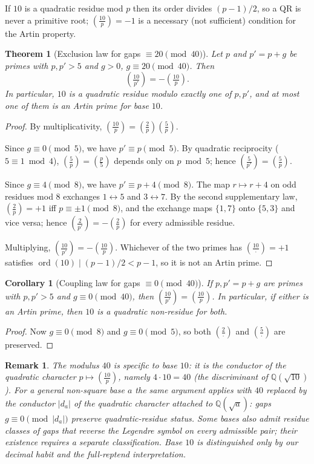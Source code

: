 \documentclass[11pt]{amsart}
\newtheorem{theorem}{Theorem}
\newtheorem{corollary}{Corollary}
\newtheorem{remark}{Remark}
\theoremstyle{definition}
\newcommand{\Lsym}[2]{\left(\tfrac{#1}{#2}\right)}
\begin{document}
If $10$ is a quadratic residue mod $p$ then its order divides $(p-1)/2$, so a
QR is never a primitive root; $\Lsym{10}{p} = -1$ is a necessary (not
sufficient) condition for the Artin property.

\begin{theorem}[Exclusion law for gaps $\equiv 20 \pmod{40}$]
	\label{thm:exclusion}
	Let $p$ and $p' = p + g$ be primes with $p, p' > 5$ and $g > 0$,
	$g \equiv 20 \pmod{40}$.
	Then
	\[
		\Lsym{10}{p'} = -\Lsym{10}{p}.
	\]
	In particular, $10$ is a quadratic residue modulo exactly one of $p, p'$, and
	at most one of them is an Artin prime for base $10$.
\end{theorem}

\begin{proof}
	By multiplicativity, $\Lsym{10}{p} = \Lsym{2}{p}\Lsym{5}{p}$.

	Since $g \equiv 0 \pmod 5$, we have $p' \equiv p \pmod 5$. By quadratic
	reciprocity ($5 \equiv 1 \bmod 4$), $\Lsym{5}{p} = \Lsym{p}{5}$ depends only on
	$p \bmod 5$; hence $\Lsym{5}{p'} = \Lsym{5}{p}$.

	Since $g \equiv 4 \pmod 8$, we have $p' \equiv p + 4 \pmod 8$. The map
	$r \mapsto r + 4$ on odd residues mod $8$ exchanges $1 \leftrightarrow 5$ and
	$3 \leftrightarrow 7$. By the second supplementary law,
	$\Lsym{2}{p} = +1$ iff $p \equiv \pm 1 \pmod 8$, and the exchange maps
	$\{1, 7\}$ onto $\{5, 3\}$ and vice versa; hence $\Lsym{2}{p'} = -\Lsym{2}{p}$
	for every admissible residue.

	Multiplying, $\Lsym{10}{p'} = -\Lsym{10}{p}$. Whichever of the two primes has
	$\Lsym{10}{\cdot} = +1$ satisfies $\operatorname{ord}(10) \mid (p-1)/2 < p-1$, so it
	is not an Artin prime.
\end{proof}

\begin{corollary}[Coupling law for gaps $\equiv 0 \pmod{40}$]
	\label{cor:coupling}
	If $p, p' = p + g$ are primes with $p, p' > 5$ and $g \equiv 0 \pmod{40}$, then
	$\Lsym{10}{p'} = \Lsym{10}{p}$. In particular, if either is an Artin prime,
	then $10$ is a quadratic non-residue for both.
\end{corollary}

\begin{proof}
	Now $g \equiv 0 \pmod 8$ and $g \equiv 0 \pmod 5$, so both
	$\Lsym{2}{\cdot}$ and $\Lsym{5}{\cdot}$ are preserved.
\end{proof}

\begin{remark}
	The modulus $40$ is specific to base $10$: it is the conductor of the
	quadratic character $p \mapsto \Lsym{10}{p}$, namely $4 \cdot 10 = 40$ (the
	discriminant of $\mathbb{Q}(\sqrt{10})$). For a general non-square base $a$
	the same argument applies with $40$ replaced by the conductor $|d_a|$ of the
	quadratic character attached to $\mathbb{Q}(\sqrt{a})$: gaps
	$g \equiv 0 \pmod{|d_a|}$ preserve quadratic-residue status. Some bases also
	admit residue classes of gaps that reverse the Legendre symbol on every
	admissible pair; their existence requires a separate classification.
	Base $10$ is distinguished only by our decimal habit and the
	full-reptend interpretation.
\end{remark}
\end{document}
